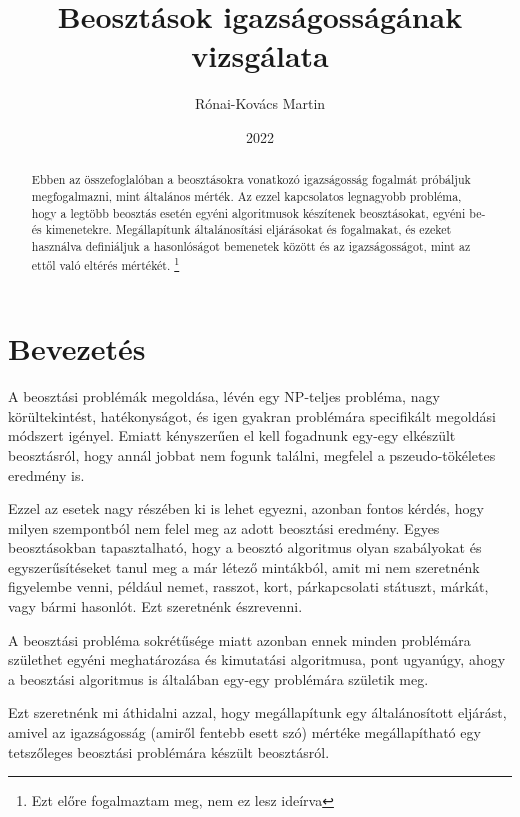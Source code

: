 \documentclass[twocolumn]{article}
\title{Beosztások igazságosságának vizsgálata}
\author{Rónai-Kovács Martin}
\date{2022}
\theoremstyle{definition}
\begin{document}
\maketitle

\begin{abstract}
    Ebben az összefoglalóban a beosztásokra vonatkozó igazságosság fogalmát próbáljuk megfogalmazni, mint általános mérték. Az ezzel kapcsolatos legnagyobb probléma, hogy a legtöbb beosztás esetén egyéni algoritmusok készítenek beosztásokat, egyéni be- és kimenetekre. Megállapítunk általánosítási eljárásokat és fogalmakat, és ezeket használva definiáljuk a hasonlóságot bemenetek között és az igazságosságot, mint az ettől való eltérés mértékét. \footnote{Ezt előre fogalmaztam meg, nem ez lesz ideírva}
\end{abstract}

\section{Bevezetés}
    A beosztási problémák megoldása, lévén egy NP-teljes probléma, nagy körültekintést, hatékonyságot, és igen gyakran problémára specifikált megoldási módszert igényel. Emiatt kényszerűen el kell fogadnunk egy-egy elkészült beosztásról, hogy annál jobbat nem fogunk találni, megfelel a pszeudo-tökéletes eredmény is. 
    
    Ezzel az esetek nagy részében ki is lehet egyezni, azonban fontos kérdés, hogy milyen szempontból nem felel meg az adott beosztási eredmény. Egyes beosztásokban tapasztalható, hogy a beosztó algoritmus olyan szabályokat és egyszerűsítéseket tanul meg a már létező mintákból, amit mi nem szeretnénk figyelembe venni, például nemet, rasszot, kort, párkapcsolati státuszt, márkát, vagy bármi hasonlót. Ezt szeretnénk észrevenni.
    
    A beosztási probléma sokrétűsége miatt azonban ennek minden problémára születhet egyéni meghatározása és kimutatási algoritmusa, pont ugyanúgy, ahogy a beosztási algoritmus is általában egy-egy problémára születik meg.
    
    Ezt szeretnénk mi áthidalni azzal, hogy megállapítunk egy általánosított eljárást, amivel az igazságosság (amiről fentebb esett szó) mértéke megállapítható egy tetszőleges beosztási problémára készült beosztásról.
    
\end{document}
